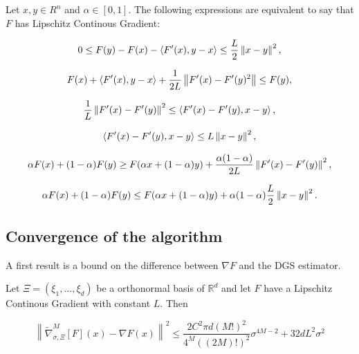\begin{prop}\label{TeoremaNesterov}
Let $ x, y \in R^{n} $ and $ \alpha \in [0,1] $. The following expressions are equivalent to say that $F$ has Lipschitz Continous Gradient:

\begin{equation}\label{FirstLipContGradEquivalence}
0 \leq F(y)-F(x)-\left\langle F^{\prime}(x), y-x\right\rangle \leq \frac{L}{2}\left\lVert x-y\right\rVert^{2},
\end{equation}

\begin{equation}
F(x)+\left\langle F^{\prime}(x), y-x\right\rangle+\frac{1}{2 L}\left\lVert F^{\prime}(x)-F^{\prime}(y)^{2}\right\rVert \leq F(y),    
\end{equation}

\begin{equation}
\frac{1}{L}\left\lVert F^{\prime}(x)-F^{\prime}(y)\right\rVert^{2} \leq\left\langle F^{\prime}(x)-F^{\prime}(y), x-y\right\rangle,    
\end{equation}

\begin{equation}
\left\langle F^{\prime}(x)-F^{\prime}(y), x-y\right\rangle \leq L\left\lVert x-y\right\rVert^{2},  
\end{equation}

\begin{equation}
\alpha F(x)+(1-\alpha) F(y) \geq F(\alpha x+(1-\alpha) y) + \frac{\alpha(1-\alpha)}{2 L}\left\lVert F^{\prime}(x)-F^{\prime}(y)\right\rVert^{2},   
\end{equation}

\begin{equation}
\alpha F(x)+(1-\alpha) F(y) \leq F(\alpha x+(1-\alpha) y) +\alpha(1-\alpha) \frac{L}{2}\left\lVert x-y\right\rVert^{2}.   
\end{equation}

\end{prop}

\subsection{Convergence of the algorithm}

A first result is a bound on the difference between $\nabla F$ and the DGS estimator.

\begin{prop}\label{DGSEstimatorBound}

Let $\Xi = \left(\xi_1,\dots,\xi_d\right)$ be a orthonormal basis of $\mathbb{R}^d$ and let $F$ have a Lipschitz Continous Gradient with constant $L$. Then

\begin{equation}\label{BoundErrorEstimatorEq}
 \left\|\widetilde{\nabla}_{\sigma, \Xi}^{M}[F](x)-\nabla F(x)\right\|^{2} \leq \frac{2 C^{2} \pi d(M !)^{2}}{4^{M}((2 M) !)^{2}} \sigma^{4 M-2}+32 d L^{2} \sigma^{2} 
\end{equation}

\end{prop}

